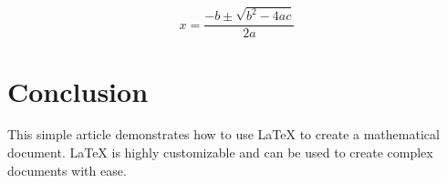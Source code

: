 \documentclass[12pt]{article}
\begin{document}
\begin{equation}
x = \frac{-b \pm \sqrt{b^2 - 4ac}}{2a}
\end{equation}

\section{Conclusion}
This simple article demonstrates how to use LaTeX to create a mathematical document. LaTeX is highly customizable and can be used to create complex documents with ease.



\end{document}
